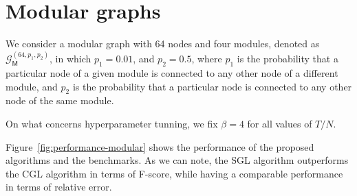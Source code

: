 \section{Modular graphs}
We consider a modular graph with 64 nodes and four modules,
denoted as $\mathcal{G}^{(64, p_1, p_2)}_{\mathsf{M}}$, in which $p_1 = 0.01$, and $p_2 = 0.5$,
where $p_1$ is the probability that a particular node of a given module is connected to any other node of a different module,
and $p_2$ is the probability that a particular node is connected to any other node of the same module.

On what concerns hyperparameter tunning, we fix $\beta = 4$ for all values of $T/N$.

Figure~\ref{fig:performance-modular} shows the performance of the proposed algorithms and
the benchmarks. As we can note, the \textsf{SGL} algorithm outperforms the \textsf{CGL} algorithm
in terms of F-score, while having a comparable performance in terms of relative error.

